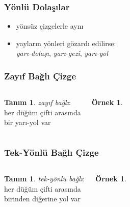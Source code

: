\documentclass[dvipsnames]{beamer}
\theoremstyle{definition}
\newtheorem{tanim}[theorem]{Tanım}
\theoremstyle{example}
\newtheorem{ornek}[theorem]{Örnek}
\theoremstyle{plain}
\begin{document}
\begin{frame}
  \frametitle{Yönlü Dolaşılar}

  \begin{itemize}
    \item yönsüz çizgelerle aynı
    \item yayların yönleri gözardı edilirse:\\
      \emph{yarı-dolaşı}, \emph{yarı-gezi}, \emph{yarı-yol}
  \end{itemize}
\end{frame}

\begin{frame}
  \frametitle{Zayıf Bağlı Çizge}

  \begin{columns}
    \begin{tanim}
      \emph{zayıf bağlı}:\\
      her düğüm çifti arasında\\
      bir yarı-yol var
    \end{tanim}

    \begin{ornek}
      \begin{center}
      \end{center}
    \end{ornek}
  \end{columns}
\end{frame}

\begin{frame}
  \frametitle{Tek-Yönlü Bağlı Çizge}

  \begin{columns}
    \begin{tanim}
      \emph{tek-yönlü bağlı}:\\
      her düğüm çifti arasında\\
      birinden diğerine yol var
    \end{tanim}

    \begin{ornek}
      \begin{center}
      \end{center}
    \end{ornek}
  \end{columns}
\end{frame}
\end{document}
